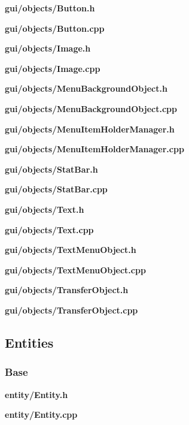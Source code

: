 \documentclass[../Main.tex]{subfiles}
\begin{document}
            \textbf{gui/objects/Button.h}
            
            \textbf{gui/objects/Button.cpp}
            

            \textbf{gui/objects/Image.h}
            
            \textbf{gui/objects/Image.cpp}
            

            \textbf{gui/objects/MenuBackgroundObject.h}
            
            \textbf{gui/objects/MenuBackgroundObject.cpp}
            

            \textbf{gui/objects/MenuItemHolderManager.h}
            
            \textbf{gui/objects/MenuItemHolderManager.cpp}
            

            \textbf{gui/objects/StatBar.h}
            
            \textbf{gui/objects/StatBar.cpp}
            

            \textbf{gui/objects/Text.h}
            
            \textbf{gui/objects/Text.cpp}
            

            \textbf{gui/objects/TextMenuObject.h}
            
            \textbf{gui/objects/TextMenuObject.cpp}
            

            \textbf{gui/objects/TransferObject.h}
            
            \textbf{gui/objects/TransferObject.cpp}
            

    \subsection{Entities}
        \subsubsection{Base}
            \textbf{entity/Entity.h}
            
            \textbf{entity/Entity.cpp}
            
\end{document}
